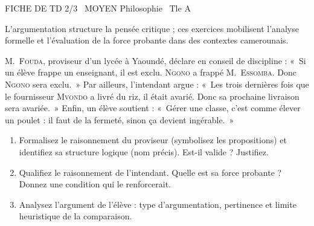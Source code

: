 \documentclass[11pt]{article}
\begin{document}
\begin{tcolorbox}[enhanced,colback=popink,colframe=popink,arc=10pt,boxrule=0pt,left=12pt,right=12pt,top=9pt,bottom=9pt]
{\color{white}\popxbold\small FICHE DE TD 2/3 \textbullet\ MOYEN \hfill Philosophie \textbullet\ Tle A\par}
\end{tcolorbox}
\vspace{4pt}
L'argumentation structure la pensée critique ; ces exercices mobilisent l'analyse formelle et l'évaluation de la force probante dans des contextes camerounais.

\begin{exercice}
M.~\textsc{Fouda}, proviseur d'un lycée à Yaoundé, déclare en conseil de discipline : «~Si un élève frappe un enseignant, il est exclu. \textsc{Ngono} a frappé M.~\textsc{Essomba}. Donc \textsc{Ngono} sera exclu.~» Par ailleurs, l'intendant argue : «~Les trois dernières fois que le fournisseur \textsc{Mvondo} a livré du riz, il était avarié. Donc sa prochaine livraison sera avariée.~» Enfin, un élève soutient : «~Gérer une classe, c'est comme élever un poulet : il faut de la fermeté, sinon ça devient ingérable.~»
\begin{enumerate}
    \item Formalisez le raisonnement du proviseur (symbolisez les propositions) et identifiez sa structure logique (nom précis). Est-il valide ? Justifiez.
    \item Qualifiez le raisonnement de l'intendant. Quelle est sa force probante ? Donnez une condition qui le renforcerait.
    \item Analysez l'argument de l'élève : type d'argumentation, pertinence et limite heuristique de la comparaison.
\end{enumerate}
\end{exercice}
\end{document}
